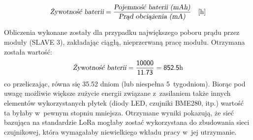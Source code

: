 \begin{equation}\label{eqn:battery-life}
    \textsl{Żywotność baterii} = \frac{\textsl{Pojemność baterii (mAh)}}{\textsl{Prąd obciążenia (mA)}}\quad\text{[h]}
\end{equation}

Obliczenia wykonane zostały dla przypadku największego poboru prądu przez moduły (SLAVE 3), zakładając ciągłą,
nieprzerwaną pracę modułu. Otrzymana została wartość:
\begin{equation*}
    \textsl{Żywotność baterii} = \mathsf{\frac{10000}{11.73}} = \mathsf{852.5}\text{h}
\end{equation*}
co przeliczając, równa się 35.52 dniom (lub niespełna 5~tygodniom). Biorąc pod uwagę możliwie większe zużycie energii
związane z~zasilaniem także innych elementów wykorzystanych płytek (diody LED, czujniki BME280, itp.) wartość ta byłaby
w~pewnym stopniu mniejsza. Otrzymane wyniki pokazują, że sieć bazująca na standardzie LoRa mogłaby zostać wykorzystana
do zbudowania sieci czujnikowej, która wymagałaby niewielkiego wkładu pracy w~jej utrzymanie.